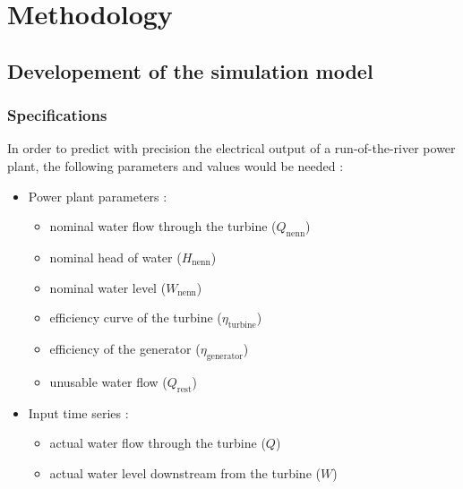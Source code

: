 \chapter{Methodology}
\label{chap:methodology}

\section{Developement of the simulation model}
\subsection{Specifications}
In order to predict with precision the electrical output of a run-of-the-river power plant, the following parameters and values would be needed : 
\begin{itemize}
\itemsep0em
 \item Power plant parameters : 
 \begin{itemize}
  \item nominal water flow through the turbine ($Q_\mathrm{nenn}$)
  \item nominal head of water ($H_\mathrm{nenn}$)
  \item nominal water level ($W_\mathrm{nenn}$)
  \item efficiency curve of the turbine ($\eta_\mathrm{turbine}$) 
  \item efficiency of the generator ($\eta_\mathrm{generator}$)  
  \item unusable water flow ($Q_\mathrm{rest}$)  
 \end{itemize}
 \item Input time series : 
 \begin{itemize}
  \item actual water flow through the turbine ($Q$)
  \item actual water level downstream from the turbine ($W$)
 \end{itemize}
\end{itemize}

